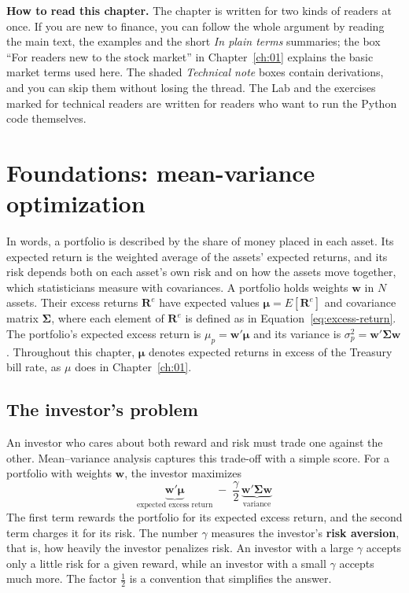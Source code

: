 \begin{callout}
\textbf{How to read this chapter.} The chapter is written for two kinds of readers at once. If you are new to finance, you can follow the whole argument by reading the main text, the examples and the short \emph{In plain terms} summaries; the box ``For readers new to the stock market'' in Chapter~\ref{ch:01} explains the basic market terms used here. The shaded \emph{Technical note} boxes contain derivations, and you can skip them without losing the thread. The Lab and the exercises marked for technical readers are written for readers who want to run the Python code themselves.
\end{callout}

\section{Foundations: mean-variance optimization}
\label{sec:12-foundations}

In words, a portfolio is described by the share of money placed in each asset. Its expected return is the weighted average of the assets' expected returns, and its risk depends both on each asset's own risk and on how the assets move together, which statisticians measure with covariances. A portfolio holds weights $\mathbf{w}$ in $N$ assets. Their excess returns $\mathbf{R}^{e}$ have expected values $\boldsymbol{\mu} = E[\mathbf{R}^{e}]$ and covariance matrix $\boldsymbol{\Sigma}$, where each element of $\mathbf{R}^{e}$ is defined as in Equation~\eqref{eq:excess-return}. The portfolio's expected excess return is $\mu_p = \mathbf{w}'\boldsymbol{\mu}$ and its variance is $\sigma_p^2 = \mathbf{w}'\boldsymbol{\Sigma}\mathbf{w}$. Throughout this chapter, $\boldsymbol{\mu}$ denotes expected returns in excess of the Treasury bill rate, as $\mu$ does in Chapter~\ref{ch:01}.

\subsection{The investor's problem}
\label{sec:12-problem}

An investor who cares about both reward and risk must trade one against the other. Mean--variance analysis captures this trade-off with a simple score. For a portfolio with weights $\mathbf{w}$, the investor maximizes
\begin{equation}
  \underbrace{\mathbf{w}'\boldsymbol{\mu}}_{\text{expected excess return}} \; - \; \frac{\gamma}{2}\,\underbrace{\mathbf{w}'\boldsymbol{\Sigma}\mathbf{w}}_{\text{variance}}
  \label{eq:12-mv-objective}
\end{equation}
The first term rewards the portfolio for its expected excess return, and the second term charges it for its risk. The number $\gamma$ measures the investor's \textbf{risk aversion}, that is, how heavily the investor penalizes risk. An investor with a large $\gamma$ accepts only a little risk for a given reward, while an investor with a small $\gamma$ accepts much more. The factor $\tfrac{1}{2}$ is a convention that simplifies the answer.

